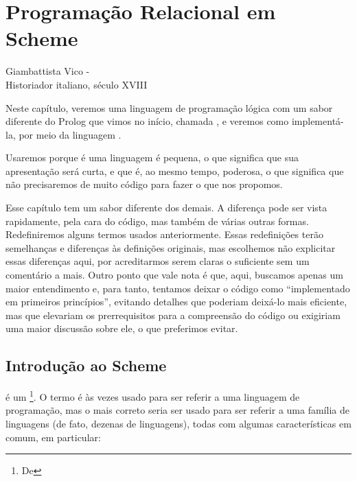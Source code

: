 
%

%

\section{Programação Relacional em Scheme}

\epigraph{}{Giambattista Vico - \\Historiador italiano, século XVIII}


Neste capítulo, veremos uma linguagem de programação lógica com um
sabor diferente do Prolog que vimos no início, chamada
, e veremos como implementá-la, por meio da
linguagem .

Usaremos  porque é uma linguagem é pequena, o
que significa que sua apresentação será curta, e que é, ao mesmo
tempo, poderosa, o que significa que não precisaremos de muito código
para fazer o que nos propomos.

Esse capítulo tem um sabor diferente dos demais. A diferença pode ser vista
rapidamente, pela cara do código, mas também de várias outras
formas. Redefiniremos alguns termos usados anteriormente. Essas
redefinições terão semelhanças e diferenças às definições originais,
mas escolhemos não explicitar essas diferenças aqui, por acreditarmos serem
claras o suficiente sem um comentário a mais. Outro ponto que vale nota é que, aqui, buscamos
apenas um maior entendimento e, para tanto, tentamos deixar o código
como ``implementado em primeiros princípios'', evitando detalhes que
poderiam deixá-lo mais eficiente, mas que elevariam os prerrequisitos para
a compreensão do código ou exigiriam uma maior discussão sobre
ele, o que preferimos evitar.

\subsection{Introdução ao Scheme}

 é um \footnote{De
  }. O termo  é às vezes
usado para ser referir a uma linguagem de programação, mas o mais
correto seria ser usado para ser referir a uma família de linguagens (de fato,
dezenas de linguagens), todas com algumas características em comum,
em particular:

